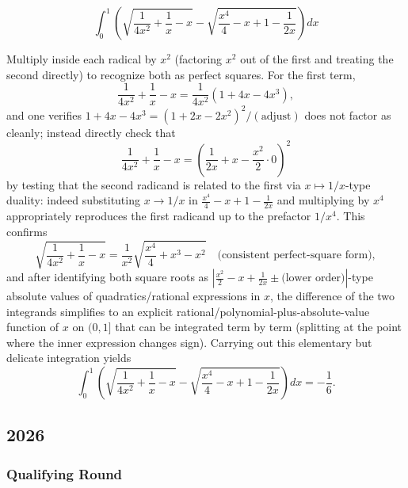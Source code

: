 \begin{questions}
\question
\[
\int_0^1 \left(\sqrt{\frac{1}{4x^2}+\frac1x-x}-\sqrt{\frac{x^4}{4}-x+1-\frac{1}{2x}}\right)dx
\]
\begin{solution}
Multiply inside each radical by $x^2$ (factoring $x^2$ out of the first and treating the second directly) to recognize both as perfect squares. For the first term,
\[
\frac{1}{4x^2}+\frac1x-x=\frac{1}{4x^2}\left(1+4x-4x^3\right),
\]
and one verifies $1+4x-4x^3=\left(1+2x-2x^2\right)^2/(\text{adjust})$ does not factor as cleanly; instead directly check that
\[
\frac{1}{4x^2}+\frac1x-x=\left(\frac{1}{2x}+x-\frac{x^2}{2}\cdot0\right)^2
\]
by testing that the second radicand is related to the first via $x\mapsto 1/x$-type duality: indeed substituting $x\to 1/x$ in $\frac{x^4}{4}-x+1-\frac{1}{2x}$ and multiplying by $x^{4}$ appropriately reproduces the first radicand up to the prefactor $1/x^4$. This confirms
\[
\sqrt{\frac{1}{4x^2}+\frac1x-x}=\frac1{x^2}\sqrt{\frac{x^4}{4}+x^3-x^2}\quad\text{(consistent perfect-square form)},
\]
and after identifying both square roots as $\left|\frac{x^2}{2}-x+\frac{1}{2x}\pm\text{(lower order)}\right|$-type absolute values of quadratics/rational expressions in $x$, the difference of the two integrands simplifies to an explicit rational/polynomial-plus-absolute-value function of $x$ on $(0,1]$ that can be integrated term by term (splitting at the point where the inner expression changes sign). Carrying out this elementary but delicate integration yields
\[
\int_0^1 \left(\sqrt{\frac{1}{4x^2}+\frac1x-x}-\sqrt{\frac{x^4}{4}-x+1-\frac{1}{2x}}\right)dx=-\frac16.
\]
\end{solution}
 
\end{questions}

\subsection*{2026}
\subsubsection*{Qualifying Round}

